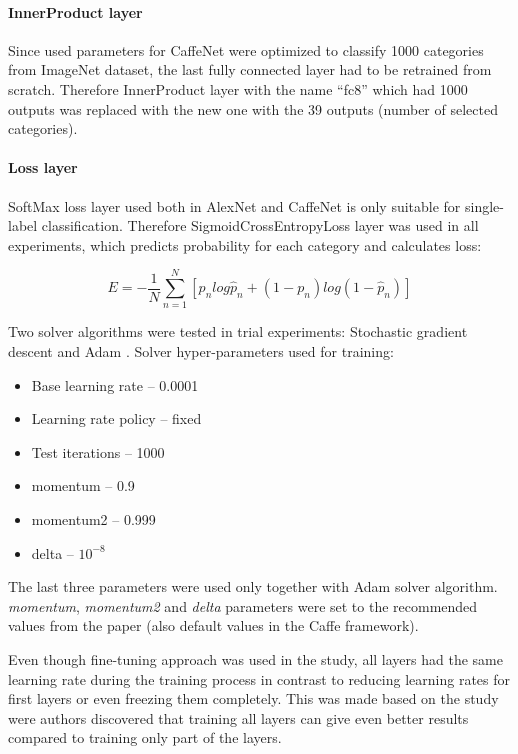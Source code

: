     \paragraph{InnerProduct layer}
    Since used parameters for CaffeNet were optimized to classify 1000 categories from ImageNet dataset, the last fully connected layer had to be retrained from scratch. Therefore InnerProduct layer with the name ``fc8'' which had 1000 outputs was replaced with the new one with the 39 outputs (number of selected categories).
    
    \paragraph{Loss layer}
    SoftMax loss layer used both in AlexNet and CaffeNet is only suitable for single-label classification. Therefore SigmoidCrossEntropyLoss layer was used in all experiments, which predicts probability for each category and calculates loss:
    
    $$
    E = -\frac{1}{N} \sum_{n=1}^{N} [p_n log \hat p_n + (1 - p_n) log(1 - \hat p_n)]
    $$
    
    Two solver algorithms were tested in trial experiments: Stochastic gradient descent \cite{sgd} and Adam \cite{adam}. Solver hyper-parameters used for training:
    \begin{itemize}
        \item Base learning rate -- 0.0001
        \item Learning rate policy -- fixed
        \item Test iterations -- 1000
        \item momentum -- 0.9
        \item momentum2 -- 0.999
        \item delta -- $10^{-8}$
    \end{itemize}
    
    The last three parameters were used only together with Adam solver algorithm. \textit{momentum}, \textit{momentum2} and \textit{delta} parameters were set to the recommended values from the paper \cite{adam} (also default values in the Caffe framework).
    
    Even though fine-tuning approach was used in the study, all layers had the same learning rate during the training process in contrast to reducing learning rates for first layers or even freezing them completely. This was made based on the study \cite{Yosinski2014HowTransferable} were authors discovered that training all layers can give even better results compared to training only part of the layers.
    
